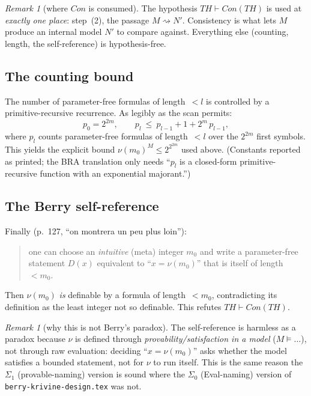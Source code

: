 \documentclass[11pt]{article}
\theoremstyle{plain}
\theoremstyle{definition}
\theoremstyle{remark}
\newtheorem{remark}[theorem]{Remark}
\newcommand{\Con}{\mathit{Con}}
\newcommand{\Thy}{\mathit{TH}}
\newcommand{\sat}{\models}
\begin{document}
\begin{remark}[where $\Con$ is consumed]\label{rmk:con}
The hypothesis $\Thy\vdash\Con(\Thy)$ is used at \emph{exactly one place}:
step~(2), the passage $M\rightsquigarrow N'$.  Consistency is what lets
$M$ produce an internal model $N'$ to compare against.  Everything else
(counting, length, the self-reference) is hypothesis-free.
\end{remark}

\subsection{The counting bound}

The number of parameter-free formulas of length~$<l$ is controlled by a
primitive-recursive recurrence.  As legibly as the scan permits:
\[
   p_0 = 2^{2m},\qquad
   p_l \ \le\ p_{l-1} + 1 + 2^{m}\,p_{l-1},
\]
where $p_l$ counts parameter-free formulas of length~$<l$ over the
$2^{2m}$ first symbols.  This yields the explicit bound
$\nu(m_0)^M\le 2^{2^{2m}}$ used above.  (Constants reported as printed;
the BRA translation only needs ``$p_l$ is a closed-form
primitive-recursive function with an exponential majorant.'')

\subsection{The Berry self-reference}

Finally (p.~127, ``on montrera un peu plus loin''):
\begin{quote}
one can choose an \emph{intuitive} (meta) integer $m_0$ and write a
parameter-free statement $D(x)$ equivalent to ``$x=\nu(m_0)$'' that is
itself of length~$<m_0$.
\end{quote}
Then $\nu(m_0)$ \emph{is} definable by a formula of length~$<m_0$,
contradicting its definition as the least integer not so definable.
This refutes $\Thy\vdash\Con(\Thy)$.

\begin{remark}[why this is not Berry's paradox]
The self-reference is harmless as a paradox because $\nu$ is defined
through \emph{provability/satisfaction in a model} ($M\sat\dots$), not
through raw evaluation: deciding ``$x=\nu(m_0)$'' asks whether the model
satisfies a bounded statement, not for $\nu$ to run itself.  This is the
same reason the $\Sigma_1$ (provable-naming) version is sound where the
$\Sigma_0$ (Eval-naming) version of \texttt{berry-krivine-design.tex}
was not.
\end{remark}
\end{document}
